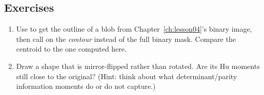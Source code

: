 \subsection*{Exercises}
\begin{enumerate}
  \item Use  to get the outline of a blob from Chapter~\ref{ch:lesson04}'s binary image, then call  on the \emph{contour} instead of the full binary mask. Compare the centroid to the one computed here.
  \item Draw a shape that is mirror-flipped rather than rotated. Are its Hu moments still close to the original? (Hint: think about what determinant/parity information moments do or do not capture.)
\end{enumerate}

\vfill
{}
